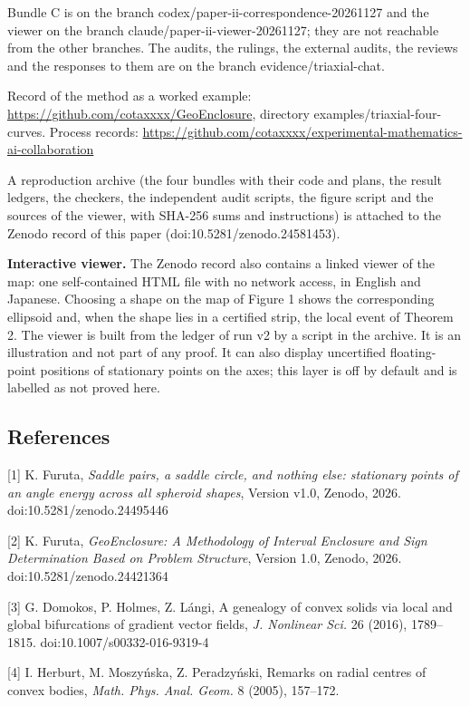 \documentclass[
  11pt,
]{article}
\begin{document}
Bundle C is on the branch codex/paper-ii-correspondence-20261127 and the
viewer on the branch claude/paper-ii-viewer-20261127; they are not
reachable from the other branches. The audits, the rulings, the external
audits, the reviews and the responses to them are on the branch
evidence/triaxial-chat.

Record of the method as a worked example:
\url{https://github.com/cotaxxxx/GeoEnclosure}, directory
examples/triaxial-four-curves. Process records:
\url{https://github.com/cotaxxxx/experimental-mathematics-ai-collaboration}

A reproduction archive (the four bundles with their code and plans, the
result ledgers, the checkers, the independent audit scripts, the figure
script and the sources of the viewer, with SHA-256 sums and
instructions) is attached to the Zenodo record of this paper
(doi:10.5281/zenodo.24581453).

\textbf{Interactive viewer.} The Zenodo record also contains a linked
viewer of the map: one self-contained HTML file with no network access,
in English and Japanese. Choosing a shape on the map of Figure 1 shows
the corresponding ellipsoid and, when the shape lies in a certified
strip, the local event of Theorem 2. The viewer is built from the ledger
of run v2 by a script in the archive. It is an illustration and not part
of any proof. It can also display uncertified floating-point positions
of stationary points on the axes; this layer is off by default and is
labelled as not proved here.

\subsection{References}

{[}1{]} K. Furuta, \emph{Saddle pairs, a saddle circle, and nothing
else: stationary points of an angle energy across all spheroid shapes},
Version v1.0, Zenodo, 2026. doi:10.5281/zenodo.24495446

{[}2{]} K. Furuta, \emph{GeoEnclosure: A Methodology of Interval
Enclosure and Sign Determination Based on Problem Structure}, Version
1.0, Zenodo, 2026. doi:10.5281/zenodo.24421364

{[}3{]} G. Domokos, P. Holmes, Z. Lángi, A genealogy of convex solids
via local and global bifurcations of gradient vector fields, \emph{J.
Nonlinear Sci.} 26 (2016), 1789--1815. doi:10.1007/s00332-016-9319-4

{[}4{]} I. Herburt, M. Moszyńska, Z. Peradzyński, Remarks on radial
centres of convex bodies, \emph{Math. Phys. Anal. Geom.} 8 (2005),
157--172.
\end{document}
